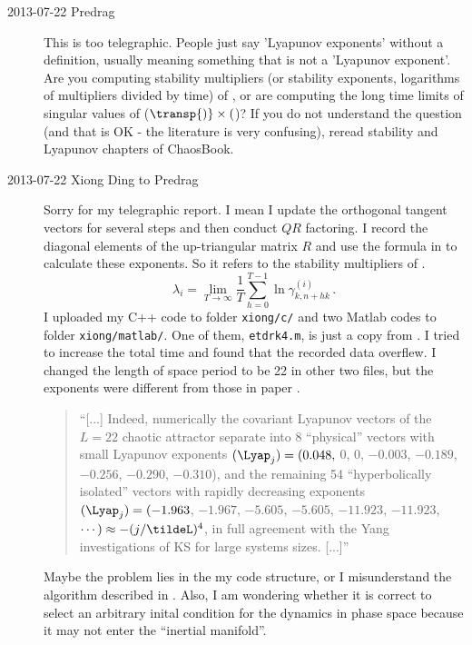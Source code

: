\begin{description}
\item[2013-07-22 Predrag] This is too telegraphic. People just say 'Lyapunov
exponents' without a definition, usually meaning something that is not
a 'Lyapunov exponent'. Are you computing
stability multipliers (or stability exponents, logarithms of multipliers
divided by
time) of \jacobianMs, or are computing the long time limits of
singular values of (\jacobianM$\transp{)}\times($\jacobianM)?
If you do not understand the question (and that is OK - the literature is
very confusing), reread stability and Lyapunov
chapters of ChaosBook.

\item[2013-07-22 Xiong Ding to Predrag] Sorry for my telegraphic report. I mean I update
the orthogonal tangent vectors for several steps and then conduct $QR$ factoring.
I record the diagonal elements of the up-triangular matrix $R$ and use the formula
in  to calculate these exponents. So it refers to the stability multipliers
of \jacobianMs.
\[
 \lambda_i=\lim_{T\to \infty} \frac{1}{T} \sum_{h=0}^{T-1}
  \ln\gamma_{k,n+hk}^{(i)}
 \,.
\]
I uploaded my C++ code to folder \texttt{xiong/c/}
and two Matlab codes to folder \texttt{\texttt{xiong/matlab/}}.
One of them, \texttt{etdrk4.m}, is just a copy from . I tried to increase
the total time and found that the recorded data overflew. I changed the length of space period
to be 22 in other two files, but the exponents were different from those in paper .


\begin{quote}
``[...] Indeed, numerically the covariant Lyapunov
vectors of the $L=22$ chaotic attractor separate
into 8 ``physical'' vectors with small Lyapunov exponents
$(\Lyap_j) = (0.048,$ 0, 0, $-0.003$, $-0.189$, $-0.256$,
$-0.290$, $-0.310$),
and the remaining 54 ``hyperbolically isolated'' vectors with rapidly
decreasing exponents
$(\Lyap_j)
= (-1.963$,   $-1.967$,   $-5.605$,   $-5.605$,  $-11.923$,  $-11.923$,
 $\cdots) \approx -(j/\tildeL)^4$,
in full agreement with the Yang \etal{} investigations
of KS for large systems sizes.
 [...]''
\end{quote}

Maybe the problem lies in the my code structure, or I misunderstand the algorithm described in
. Also, I am wondering whether it is correct to select an arbitrary inital
condition for the dynamics in phase space because it may not enter the ``inertial manifold''.


\end{description}

